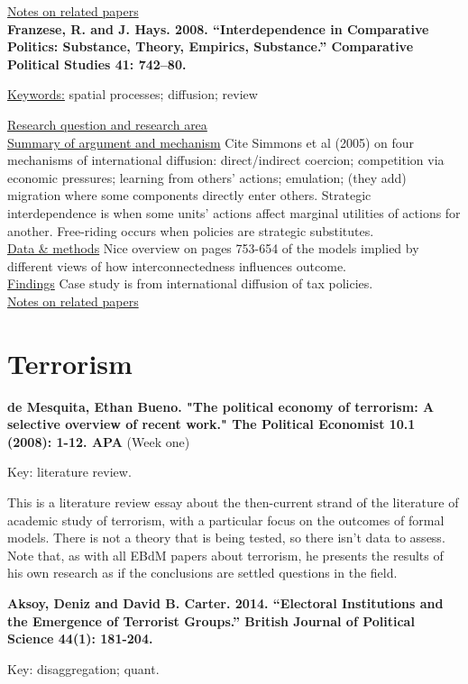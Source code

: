\documentclass{article}[12pt]
\begin{document}
\underline{Notes on related papers}\\


\textbf{Franzese, R. and J. Hays. 2008. “Interdependence in Comparative Politics: Substance, Theory, Empirics, Substance.” Comparative Political Studies 41: 742–80.}

\underline{Keywords:} spatial processes; diffusion; review

\underline{Research question and research area}\\
\underline{Summary of argument and mechanism} Cite Simmons et al (2005) on four mechanisms of international diffusion: direct/indirect coercion; competition via economic pressures; learning from others' actions; emulation; (they add) migration where some components directly enter others. Strategic interdependence is when some units' actions affect marginal utilities of actions for another.  Free-riding occurs when policies are strategic substitutes.\\
\underline{Data \& methods} Nice overview on pages 753-654 of the models implied by different views of how interconnectedness influences outcome.  \\
\underline{Findings} Case study is from international diffusion of tax policies.\\
\underline{Notes on related papers}\\

\section{Terrorism}

\textbf{de Mesquita, Ethan Bueno. "The political economy of terrorism: A selective overview of recent work." The Political Economist 10.1 (2008): 1-12.
APA} (Week one)

Key: literature review.
 
This is a literature review essay about the then-current strand of the literature of academic study of terrorism, with a particular focus on the outcomes of formal models.  There is not a theory that is being tested, so there isn't data to assess. Note that, as with all EBdM papers about terrorism, he presents the results of his own research as if the conclusions are settled questions in the field.

\textbf{Aksoy, Deniz and David B. Carter. 2014. “Electoral Institutions and the Emergence of Terrorist Groups.” British Journal of Political Science 44(1): 181-204.}

Key: disaggregation; quant.
\end{document}
